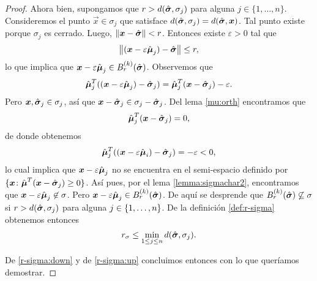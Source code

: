 \begin{proof}
	Ahora bien, supongamos que $r > d(\hat{\boldsymbol{ \sigma }}, \sigma_j)$ para alguna $j \in \lbrace 1, \ldots,
	n \rbrace$. Consideremos el punto $\vec{x} \in \sigma_j$ que satisface $d(\hat{\boldsymbol{ \sigma }}, \sigma_j) =
	d(\hat{\boldsymbol{ \sigma }}, \boldsymbol{x})$. Tal punto existe porque $\sigma_j$ es cerrado. Luego,
	$\left\lVert \boldsymbol{x} - \hat{\boldsymbol{ \sigma }} \right\rVert < r$. Entonces existe $\varepsilon > 0$ tal que
	\begin{equation*}
		\left\lVert (\boldsymbol{x} - \varepsilon\hat{\boldsymbol{ \mu }}_j) - \hat{\boldsymbol{ \sigma }} \right\rVert \leq r,
	\end{equation*}
	lo que implica que $\boldsymbol{x} - \varepsilon\hat{\boldsymbol{ \mu }}_j \in
	B_r^{(k)}(\hat{\boldsymbol{ \sigma }})$. Observemos que
	\begin{equation*}
		\hat{\boldsymbol{\mu}}_j^T((\boldsymbol{x} - \varepsilon\hat{\boldsymbol{\mu}}_j) - \hat{\boldsymbol{ \sigma }}_j)
		=
		\hat{\boldsymbol{\mu}}_j^T(\boldsymbol{x} - \hat{\boldsymbol{ \sigma }}_j) - \varepsilon.
	\end{equation*}
	Pero $\boldsymbol{x}, \hat{\boldsymbol{ \sigma }}_j \in \sigma_j$, así que $\boldsymbol{x} - \hat{\boldsymbol{ \sigma }}_j \in \sigma_j -
	\hat{\boldsymbol{ \sigma }}_j$. Del lema \ref{mu:orth} encontramos que
	\begin{equation*}
		\hat{\boldsymbol{\mu}}_j^T(\boldsymbol{x} - \hat{\boldsymbol{ \sigma }}_j) = 0,
	\end{equation*}
	de donde obtenemos
	\begin{equation*}
		\hat{\boldsymbol{\mu}}_j^T((\boldsymbol{x} - \varepsilon\hat{\boldsymbol{\mu}}_i) - \hat{\boldsymbol{ \sigma }}_j)
		= -\varepsilon < 0,
	\end{equation*}
	lo cual implica que $\boldsymbol{x} - \varepsilon\hat{\boldsymbol{\mu}}_j$ no se encuentra en el semi-espacio
	definido por $\lbrace \boldsymbol{x} \colon \hat{\boldsymbol{\mu}}^T(\boldsymbol{x} - \hat{\boldsymbol{ \sigma }}_j) \geq 0 \rbrace$. Así pues,
	por el lema \ref{lemma:sigmachar2}, encontramos que $\boldsymbol{x} - \varepsilon\hat{\boldsymbol{\mu}}_j \not\in
	\sigma$. Pero $\boldsymbol{x} - \varepsilon\hat{\boldsymbol{\mu}}_j \in B_r^{(k)}(\hat{\boldsymbol{ \sigma }})$. De aquí se desprende
	que $B_r^{(k)}(\hat{\boldsymbol{ \sigma }}) \not\subseteq \sigma$ si $r > d(\hat{\boldsymbol{ \sigma }}, \sigma_j)$ para
	alguna $j \in \lbrace 1, \ldots, n \rbrace$. De la definición \ref{def:r-sigma} obtenemos entonces
	\begin{equation}
		\label{r-sigma:up}
		r_\sigma \leq \min_{1 \leq j \leq n}d(\hat{\boldsymbol{ \sigma }}, \sigma_j).
	\end{equation}

	De \eqref{r-sigma:down} y de \eqref{r-sigma:up} concluimos entonces con lo que queríamos
	demostrar.
\end{proof}


